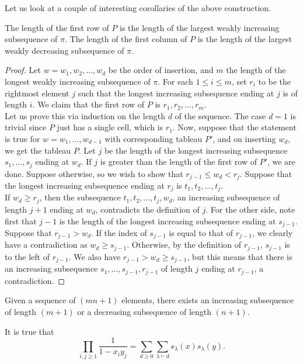	Let us look at a couple of interesting corollaries of the above construction.
	\begin{ftheo}[Schensted]
		The length of the first row of $P$ is the length of the largest weakly increasing subsequence of $\pi$. The length of the first column of $P$ is the length of the largest weakly decreasing subsequence of $\pi$.
	\end{ftheo}
	\begin{proof}
		Let $w = w_1,w_2,\ldots,w_d$ be the order of insertion, and $m$ the length of the longest weakly increasing subsequence of $\pi$. For each $1 \le i \le m$, set $r_i$ to be the rightmost element $j$ such that the longest increasing subsequence ending at $j$ is of length $i$. We claim that the first row of $P$ is $r_1,r_2,\ldots,r_m$.\\
		Let us prove this via induction on the length $d$ of the sequence. The case $d = 1$ is trivial since $P$ just has a single cell, which is $r_1$. Now, suppose that the statement is true for $w = w_1,\ldots,w_{d-1}$ with corresponding tableau $P'$, and on inserting $w_d$, we get the tableau $P$. Let $j$ be the length of the longest increasing subsequence $s_{1},\ldots,s_{j}$ ending at $w_d$. If $j$ is greater than the length of the first row of $P'$, we are done. Suppose otherwise, so we wish to show that $r_{j-1} \le w_d < r_j$. Suppose that the longest increasing subsequence ending at $r_j$ is $t_1,t_2,\ldots,t_j$.\\
		If $w_d \ge r_j$, then the subsequence $t_1,t_2,\ldots,t_j,w_d$, an increasing subsequence of length $j+1$ ending at $w_d$, contradicts the definition of $j$. For the other side, note first that $j-1$ is the length of the longest increasing subsequence ending at $s_{j-1}$. Suppose that $r_{j-1} > w_d$. If the index of $s_{j-1}$ is equal to that of $r_{j-1}$, we clearly have a contradiction as $w_d \ge s_{j-1}$. Otherwise, by the definition of $r_{j-1}$, $s_{j-1}$ is to the left of $r_{j-1}$. We also have $r_{j-1} > w_d \ge s_{j-1}$, but this means that there is an increasing subsequence $s_1,\ldots,s_{j-1},r_{j-1}$ of length $j$ ending at $r_{j-1}$, a contradiction.
	\end{proof}

	\begin{fcor}
		Given a sequence of $(mn+1)$ elements, there exists an increasing subsequence of length $(m+1)$ or a decreasing subsequence of length $(n+1)$.
	\end{fcor}

	\begin{fcor}
		It is true that
		\[ \prod_{i,j \ge 1} \frac{1}{1-x_iy_j} = \sum_{d \ge 0} \sum_{\lambda \vdash d} s_\lambda(x) s_\lambda(y). \]
	\end{fcor}

